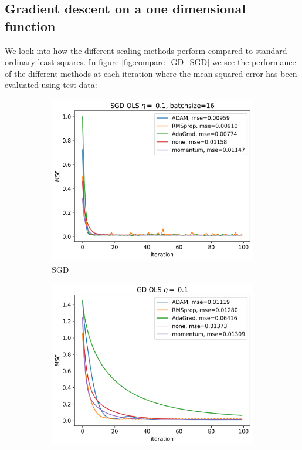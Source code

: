 \documentclass[11pt]{article}
\begin{document}
\subsection{Gradient descent on a one dimensional function}
We look into how the different scaling methods perform compared to standard ordinary least squares. In figure \ref{fig:compare_GD_SGD} we see the performance of the different methods at each iteration where the mean squared error has been evaluated using test data:
\begin{figure}[H]
  \begin{subfigure}{.5\textwidth}
    \centering
    \includegraphics[width=\textwidth]{../figures/SGD_methods_OLS_eta_0.1.png}
    \caption{SGD}
    \label{fig:}
  \end{subfigure}
  \begin{subfigure}{.5\textwidth}
    \centering
    \includegraphics[width=\textwidth]{../figures/GD_methods_OLS_eta_0.1.png}

\end{subfigure}
\end{figure}
\end{document}
